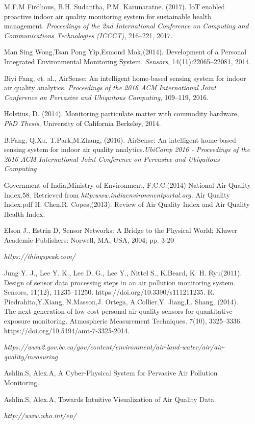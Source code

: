 \documentclass[11pt]{article}
\begin{document}
\begin{thebibliography}{abrv}
 M.F.M Firdhous, B.H. Sudantha, P.M. Karunaratne. (2017). IoT enabled proactive indoor air quality monitoring system for sustainable health management. 
{\it Proceedings of the 2nd International Conference on Computing and Communications Technologies (ICCCT)}, 216--221, 2017.

 Man Sing Wong,Tsan Pong Yip,Esmond Mok,(2014). Development of a Personal Integrated Environmental Monitoring System. {\it Sensors}, 14(11):22065--22081, 2014. 

 Biyi Fang, et. al.,  AirSense: An intelligent home-based sensing system for indoor air quality analytics. {\it Proceedings of the 2016 ACM International Joint Conference on Pervasive and Ubiquitous Computing}, 109--119, 2016.

 Holstius, D. (2014). Monitoring particulate matter with commodity hardware, {\it PhD Thesis}, University of California Berkeley, 2014.

 B.Fang, Q.Xu, T.Park,M.Zhang, (2016). AirSense: An intelligent home-based sensing system for indoor air quality analytics.{\it UbiComp 2016 - Proceedings of the 2016 ACM International Joint Conference on Pervasive and Ubiquitous Computing}

 Government of India,Ministry of Environment, F.C.C.(2014) National Air Quality Index,58. Retrieved from {\it http:www.indiaenvironmentportal.org.} Air Quality Index.pdf
  H. Chen,R. Copes,(2013). Review of Air Quality Index and Air Quality Health Index.

  Elson J., Estrin D, Sensor Networks: A Bridge to the Physical World; Kluwer Academic Publishers: Norwell, MA, USA, 2004; pp. 3-20

 {\it https://thingspeak.com/}

 Jung Y. J., Lee Y. K., Lee D. G., Lee Y., Nittel S., K.Beard, K. H. Ryu(2011). Design of sensor data processing steps in an air pollution monitoring system. Sensors, 11(12), 11235–11250. https://doi.org/10.3390/s111211235.
  R. Piedrahita,Y.Xiang, N.Masson,J. Ortega, A.Collier,Y. Jiang,L. Shang, (2014). The next generation of low-cost personal air quality sensors for quantitative exposure monitoring. Atmospheric Measurement Techniques, 7(10), 3325–3336. https://doi.org/10.5194/amt-7-3325-2014.

 {\it https://www2.gov.bc.ca/gov/content/environment/air-land-water/air/air-quality/measuring}

 Ashlin.S, Alex.A,  A Cyber-Physical System for Pervasive Air Pollution Monitoring.

 Ashlin.S, Alex.A, Towards Intuitive Visualization of Air Quality Data.

 {\it http://www.who.int/en/ }

\end{thebibliography}
\end{document}

